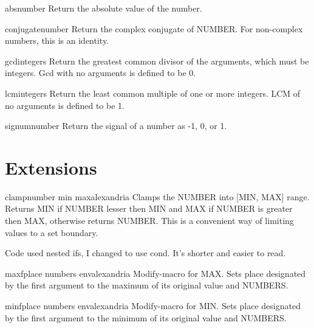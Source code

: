 \begin{function}{abs}{number}{}{}
  Return the absolute value of the number.
\end{function}

\begin{function}{conjugate}{number}{}{}
  Return the complex conjugate of NUMBER. For non-complex numbers, this is
  an identity.
\end{function}

\begin{function}{gcd}{\rest integers}{}{}
  Return the greatest common divisor of the arguments, which must be
  integers. Gcd with no arguments is defined to be 0.
\end{function}

\begin{function}{lcm}{\rest integers}{}{}
  Return the least common multiple of one or more integers. LCM of no
  arguments is defined to be 1.
\end{function}

\begin{function}{signum}{number}{}{}
  Return the signal of a number as -1, 0, or 1.
\end{function}

\section{Extensions}
\label{sec:extensions-1}

\begin{function}{clamp}{number min max}{alexandria}{}
  Clamps the NUMBER into [MIN, MAX] range. Returns MIN if NUMBER
  lesser then MIN and MAX if NUMBER is greater then MAX, otherwise
  returns NUMBER. This is a convenient way of limiting values to a set
  boundary.
  \begin{devnote}
    Code used nested ifs, I changed to use cond. It's shorter and
    easier to read.
  \end{devnote}
\end{function}

\begin{macro}{maxf}{place \rest numbers \env env}{alexandria}{}
  Modify-macro for MAX. Sets place designated by the first argument to the
maximum of its original value and NUMBERS.
\end{macro}

\begin{macro}{minf}{place \rest numbers \env env}{alexandria}{}
  Modify-macro for MIN. Sets place designated by the first argument to the
minimum of its original value and NUMBERS.
\end{macro}

